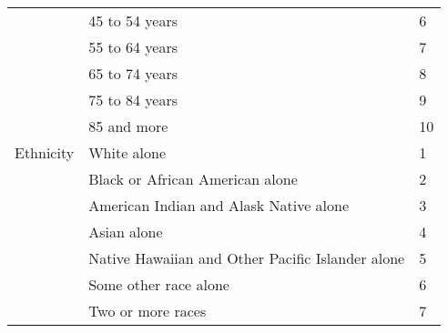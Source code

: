 \begin{centering}
\begin{tabular}{p{2in}ll}
&	45 to 54 years	& 6\\ %
&	55 to 64 years	& 7\\ %
&	65 to 74 years	& 8\\ %
&	75 to 84 years	& 9\\ %
&	85 and more	 & 10\\ \hline
Ethnicity &	White alone	& 1\\ %
&	Black or African American alone	& 2\\ %
&	American Indian and Alask Native alone	& 3\\ %
&	Asian alone	& 4\\ %
&	Native Hawaiian and Other Pacific Islander alone &	5\\ %
&	Some other race alone	& 6\\ %
&	Two or more races	& 7\\ \hline
\end{tabular}
\end{centering}


